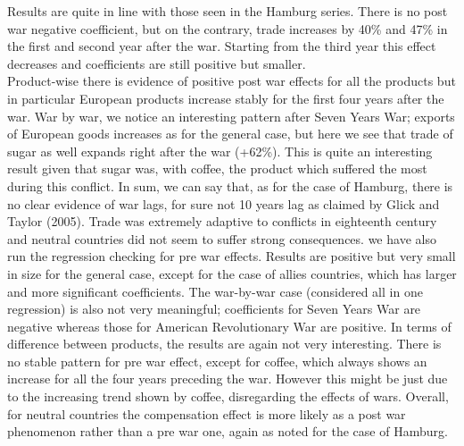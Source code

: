 \documentclass[12pt,a4paper,notitlepage,english]{article}
\begin{document}
Results are quite in line with those seen in the Hamburg series.
There is no post war negative coefficient, but on the contrary, trade increases by 40\% and 47\% in the first and second year after the war.
Starting from the third year this effect decreases and coefficients are still positive but smaller. \\
Product-wise there is evidence of positive post war effects for all the products but in particular European products increase stably for the first four years after the war.
War by war, we notice an interesting pattern after Seven Years War; exports of European goods increases as for the general case, but here we see that trade of sugar as well expands right after the war (+62\%).
This is quite an interesting result given that sugar was, with coffee, the product which suffered the most during this conflict.
In sum, we can say that, as for the case of Hamburg, there is no clear evidence of war lags, for sure not 10 years lag as claimed by Glick and Taylor (2005).
Trade was extremely adaptive to conflicts in eighteenth century and neutral countries did not seem to suffer strong consequences.
we have also run the regression checking for pre war effects.
Results are positive but very small in size for the general case, except for the case of allies countries, which has larger and more significant coefficients.
The war-by-war case (considered all in one regression) is also not very meaningful; coefficients for Seven Years War are negative whereas those for American Revolutionary War are positive.
In terms of difference between products, the results are again not very interesting.
There is no stable pattern for pre war effect, except for coffee, which always shows an increase for all the four years preceding the war.
However this might be just due to the increasing trend shown by coffee, disregarding the effects of wars.
Overall, for neutral countries the compensation effect is more likely as a post war phenomenon rather than a pre war one, again as noted for the case of Hamburg.
\fi

\iffalse
\end{document}
